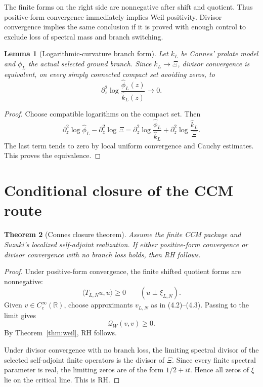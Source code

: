 \documentclass[11pt]{amsart}
\newtheorem{theorem}{Theorem}[section]
\newtheorem{lemma}[theorem]{Lemma}
\theoremstyle{definition}
\theoremstyle{remark}
\newcommand{\R}{\mathbb R}
\newcommand{\QW}{\mathcal Q_W}
\newcommand{\XiR}{\Xi}
\begin{document}
The finite forms on the right side are nonnegative after shift and
quotient.  Thus positive-form convergence immediately implies Weil
positivity.  Divisor convergence implies the same conclusion if it is
proved with enough control to exclude loss of spectral mass and branch
switching.

\begin{lemma}[Logarithmic-curvature branch form]
\label{lem:branch}
Let \(k_L\) be Connes' prolate model and \(\phi_L\) the actual selected
ground branch.  Since \(\widehat k_L\to\XiR\), divisor convergence is
equivalent, on every simply connected compact set avoiding zeros, to
\[
 \boxed{
 \partial_z^2\log
 \frac{\widehat\phi_L(z)}{\widehat k_L(z)}
 \longrightarrow0 .}
\tag{4.4}
\]
\end{lemma}

\begin{proof}
Choose compatible logarithms on the compact set.  Then
\[
 \partial_z^2\log\widehat\phi_L-\partial_z^2\log\XiR
 =
 \partial_z^2\log\frac{\widehat\phi_L}{\widehat k_L}
 +
 \partial_z^2\log\frac{\widehat k_L}{\XiR}.
\tag{4.5}
\]
The last term tends to zero by local uniform convergence and Cauchy
estimates.  This proves the equivalence.
\end{proof}

\section{Conditional closure of the CCM route}

\begin{theorem}[Connes closure theorem]
\label{thm:closure}
Assume the finite CCM package and Suzuki's localized self-adjoint
realization.  If either positive-form convergence or divisor convergence
with no branch loss holds, then RH follows.
\end{theorem}

\begin{proof}
Under positive-form convergence, the finite shifted quotient forms are
nonnegative:
\[
 \langle T_{L,N}u,u\rangle\ge0
 \qquad(u\perp\xi_{L,N}).
\tag{5.1}
\]
Given \(v\in C_c^\infty(\R)\), choose approximants \(v_{L,N}\) as in
(4.2)--(4.3).  Passing to the limit gives
\[
 \QW(v,v)\ge0.
\tag{5.2}
\]
By Theorem~\ref{thm:weil}, RH follows.

Under divisor convergence with no branch loss, the limiting spectral
divisor of the selected self-adjoint finite operators is the divisor of
\(\XiR\).  Since every finite spectral parameter is real, the limiting
zeros are of the form \(1/2+it\).  Hence all zeros of \(\xi\) lie on the
critical line.  This is RH.
\end{proof}
\end{document}

